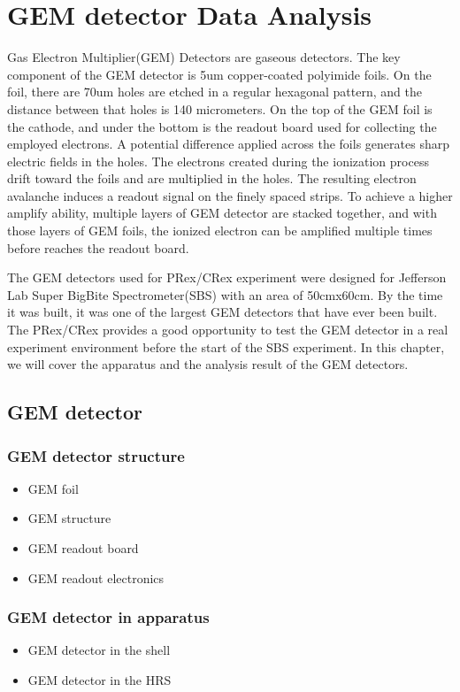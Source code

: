 \chapter{GEM detector Data Analysis}

Gas Electron Multiplier(GEM) Detectors are gaseous detectors. The key component of the GEM detector is 5um copper-coated polyimide foils. On the foil, there are 70um holes are etched in a regular hexagonal pattern, and the distance between that holes is 140 micrometers. On the top of the GEM foil is the cathode, and under the bottom is the readout board used for collecting the employed electrons. A potential difference applied across the foils generates sharp electric fields in the holes. The electrons created during the ionization process drift toward the foils and are multiplied in the holes. The resulting electron avalanche induces a readout signal on the finely spaced strips. To achieve a higher amplify ability, multiple layers of GEM detector are stacked together, and with those layers of GEM foils, the ionized electron can be amplified multiple times before reaches the readout board. 

The GEM detectors used for PRex/CRex experiment were designed for Jefferson Lab Super BigBite Spectrometer(SBS) with an area of 50cmx60cm. By the time it was built, it was one of the largest GEM detectors that have ever been built. The PRex/CRex provides a good opportunity to test the GEM detector in a real experiment environment before the start of the SBS experiment. In this chapter, we will cover the apparatus and the analysis result of the GEM detectors. 


\section{GEM detector}
\subsection{GEM detector structure}
\begin{itemize}
    \item GEM foil
    \item GEM structure 
    \item GEM readout board
    \item GEM readout electronics
\end{itemize}
\subsection{GEM detector in apparatus}
\begin{itemize}
    \item GEM detector in the shell
    \item GEM detector in the HRS
\end{itemize}
